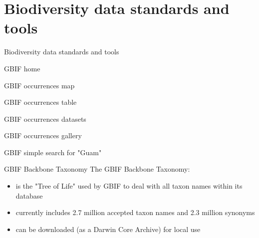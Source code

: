 \documentclass[]{beamer}
\begin{document}

\section{Biodiversity data standards and tools}

\begin{frame}{Biodiversity data standards and tools}
\end{frame}


\begin{frame}{GBIF home}
\end{frame}


\begin{frame}{GBIF occurrences map}
\end{frame}


\begin{frame}{GBIF occurrences table}
\end{frame}


\begin{frame}{GBIF occurrences datasets}
\end{frame}


\begin{frame}{GBIF occurrences gallery}
\end{frame}


\begin{frame}{GBIF simple search for "Guam"}
\end{frame}


\begin{frame}{GBIF Backbone Taxonomy}
The GBIF Backbone Taxonomy:
\begin{itemize}
\item is the "Tree of Life" used by GBIF to deal with all taxon names within its database
\item currently includes 2.7 million accepted taxon names and 2.3 million synonyms
\item can be downloaded (as a Darwin Core Archive) for local use
\end{itemize}
\end{frame}
\end{document}

